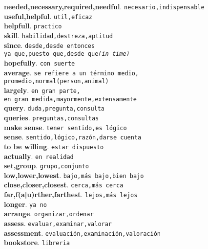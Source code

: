 \documentclass[twocolumn]{article}
\begin{document}
	\textsf{\textbf{needed,necessary,required,needful}}. \texttt{necesario,indispensable}\\
	\textsf{\textbf{useful,helpful}}. \texttt{util,eficaz}\\
	\textsf{\textbf{helpfull}}. \texttt{practico}\\
	\textsf{\textbf{skill}}. \texttt{habilidad,destreza,aptitud}\\
	\textsf{\textbf{since}}. \texttt{desde,desde entonces\\ya que,puesto que,desde que{\scriptsize \textsl{(in time)}}}\\
	\textsf{\textbf{hopefully}}. \texttt{con suerte}\\
	\textsf{\textbf{average}}. \texttt{se refiere a un t\'ermino medio,\\promedio,normal(person,animal)}\\
	\textsf{\textbf{largely}}. \texttt{en gran parte,\\en gran medida,mayormente,extensamente}\\
	\textsf{\textbf{query}}. \texttt{duda,pregunta,consulta}\\
	\textsf{\textbf{queries}}. \texttt{preguntas,consultas}\\
	\textsf{\textbf{make sense}}. \texttt{tener sentido,es l\'ogico}\\
	\textsf{\textbf{sense}}. \texttt{sentido,l\'ogico,raz\'on,darse cuenta}\\
	\textsf{\textbf{to be willing}}. \texttt{estar dispuesto}\\
	\textsf{\textbf{actually}}. \texttt{en realidad}\\
	\textsf{\textbf{set,group}}. \texttt{grupo,conjunto}\\
	\textsf{\textbf{low,lower,lowest}}. \texttt{bajo,m\'as bajo,bien bajo}\\
	\textsf{\textbf{close,closer,closest}}. \texttt{cerca,m\'as cerca}\\
	\textsf{\textbf{far,f(a|u)rther,farthest}}. \texttt{lejos,m\'as lejos}\\
	\textsf{\textbf{longer}}. \texttt{ya no}\\
	\textsf{\textbf{arrange}}. \texttt{organizar,ordenar}\\
	\textsf{\textbf{assess}}. \texttt{evaluar,examinar,valorar}\\
	\textsf{\textbf{assessment}}. \texttt{evaluaci\'on,examinaci\'on,valoraci\'on}\\
	\textsf{\textbf{bookstore}}. \texttt{libreria}\\
\end{document}
